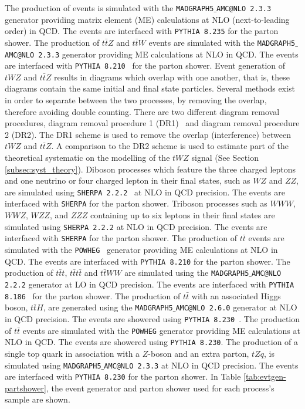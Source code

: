 The production of \tWZ events is simulated with the \texttt{MADGRAPH5$\_$AMC@NLO 2.3.3}~\cite{Alwall:2014hca} generator providing matrix element (ME) calculations at NLO (next-to-leading order) in QCD. The events are interfaced with \texttt{PYTHIA 8.235} for the parton shower. The production of $t\bar{t}Z$ and $t\bar{t}W$ events are simulated with the \texttt{MADGRAPH5$\_$AMC@NLO 2.3.3} generator providing ME calculations at NLO in QCD. The events are interfaced with \texttt{PYTHIA 8.210}~\cite{Sjostrand:2014zea} for the parton shower. Event generation of $tWZ$ and $t\bar{t}Z$ results in diagrams which overlap with one another, that is, these diagrams contain the same initial and final state particles. Several methods exist in order to separate between the two processes, by removing the overlap, therefore avoiding double counting. There are two different diagram removal procedures, diagram removal procedure 1 (DR1)~\cite{Demartin:2016axk} and diagram removal procedure 2 (DR2). The DR1 scheme is used to remove the overlap (interference) between $tWZ$ and $t\bar{t}Z$. A comparison to the DR2 scheme is used to estimate part of the theoretical systematic on the modelling of the $tWZ$ signal (See Section \ref{subsec:syst_theory}). Diboson processes which feature the three charged leptons and one neutrino or four charged lepton in their final states, such as $WZ$ and $ZZ$, are simulated using \texttt{SHERPA 2.2.2}~\cite{Bothmann_2019} at NLO in QCD precision. The events are interfaced with \texttt{SHERPA} for the parton shower. Triboson processes such as $WWW$, $WWZ$, $WZZ$, and $ZZZ$ containing up to six leptons in their final states are simulated using \texttt{SHERPA 2.2.2} at NLO in QCD precision. The events are interfaced with \texttt{SHERPA} for the parton shower. The production of $t\bar{t}$ events are simulated with the \texttt{POWHEG}~\cite{Frixione:2007vw} generator providing ME calculations at NLO in QCD. The events are interfaced with \texttt{PYTHIA 8.210} for the parton shower. The production of $t\bar{t}t$, $t\bar{t}t\bar{t}$ and $t\bar{t}WW$ are simulated using the \texttt{MADGRAPH5$\_$AMC@NLO 2.2.2} generator at LO in QCD precision. The events are interfaced with \texttt{PYTHIA 8.186}~\cite{Sjostrand:2007gs} for the parton shower. The production of $t\bar{t}$ with an associated Higgs boson, $t\bar{t}H$, are generated using the \texttt{MADGRAPH5$\_$AMC@NLO 2.6.0} generator at NLO in QCD precision. The events are showered using \texttt{PYTHIA 8.230}~\cite{Sjostrand:2014zea}. The production of $t\bar{t}$ events are simulated with the \texttt{POWHEG} generator providing ME calculations at NLO in QCD. The events are showered using \texttt{PYTHIA 8.230}. The production of a single top quark in association with a $Z$-boson and an extra parton, $tZq$, is simulated using \texttt{MADGRAPH5$\_$AMC@NLO 2.3.3} at NLO in QCD precision. The events are interfaced with \texttt{PYTHIA 8.230} for the parton shower. In Table \ref{tab:evtgen-partshower}, the event generator and parton shower used for each process's sample are shown.

